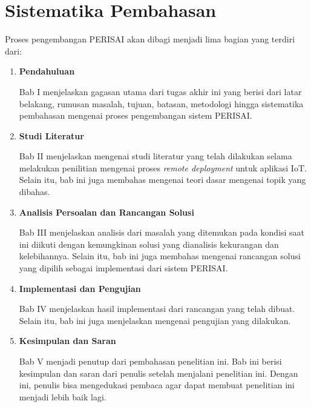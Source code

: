 \section{Sistematika Pembahasan}

Proses pengembangan PERISAI akan dibagi menjadi lima bagian yang terdiri dari:

\begin{enumerate}
  \item \textbf{Pendahuluan}

        Bab I menjelaskan gagasan utama dari tugas akhir ini yang berisi dari latar belakang, rumusan masalah, tujuan, batasan, metodologi hingga sistematika pembahasan mengenai proses pengembangan sistem PERISAI.

  \item \textbf{Studi Literatur}

        Bab II menjelaskan mengenai studi literatur yang telah dilakukan selama melakukan penilitian mengenai proses \textit{remote deployment} untuk aplikasi IoT. Selain itu, bab ini juga membahas mengenai teori dasar mengenai topik yang dibahas.

  \item \textbf{Analisis Persoalan dan Rancangan Solusi}

        Bab III menjelaskan analisis dari masalah yang ditemukan pada kondisi saat ini diikuti dengan kemungkinan solusi yang dianalisis kekurangan dan kelebihannya. Selain itu, bab ini juga membahas mengenai rancangan solusi yang dipilih sebagai implementasi dari sistem PERISAI.

  \item \textbf{Implementasi dan Pengujian}


        Bab IV menjelaskan hasil implementasi dari rancangan yang telah dibuat. Selain itu, bab ini juga menjelaskan mengenai pengujian yang dilakukan.

  \item \textbf{Kesimpulan dan Saran}


        Bab V menjadi penutup dari pembahasan penelitian ini. Bab ini berisi kesimpulan dan saran dari penulis setelah menjalani penelitian ini. Dengan ini, penulis bisa mengedukasi pembaca agar dapat membuat penelitian ini menjadi lebih baik lagi.

\end{enumerate}
